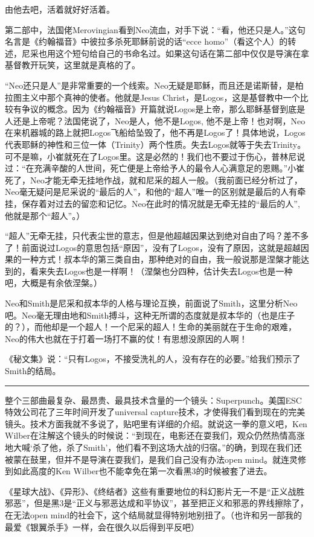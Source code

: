 \documentclass[UTF8]{ctexart}
\newcommand{\myparsep}{\noindent \rule[0.5ex]{\linewidth}{1pt}}
\begin{document}
由他去吧，活着就好好活着。

第二部中，法国佬Merovingian看到Neo流血，对手下说：“看，他还只是人。”这句名言是《约翰福音》中彼拉多杀死耶稣前说的话“ecce homo”（看这个人）的转述，尼采也用这个短句给自己的书命名过。如果这句话在第二部中仅仅是导演在拿基督教开玩笑，这里就是真格的了。

“Neo还只是人”是非常重要的一个线索。Neo无疑是耶稣，而且还是诺斯替，是柏拉图主义中那个真神的使者。他就是Jesus Christ，是Logos，这是基督教中一个比较有争议的概念。因为《约翰福音》开篇就说Logos是上帝，那么耶稣基督到底是人还是上帝呢？法国佬说了，Neo是人，他不是Logos, 他不是上帝！也对啊，Neo在来机器城的路上就把Logos飞船给坠毁了，他不再是Logos了！具体地说，Logos代表耶稣的神性和三位一体（Trinity）两个性质。失去Logos就等于失去Trinity。可不是嘛，小崔就死在了Logos里。这是必然的！我们也不要过于伤心，普林尼说过：“在充满辛酸的人世间，死亡便是上帝给予人的最令人心满意足的恩赐。”小崔死了，Neo才能无牵无挂地作战，就和尼采的超人一般。（我前面已经分析过了，Neo毫无疑问是尼采说的“最后的人”，和他的“超人”唯一的区别就是最后的人有牵挂，保存着对过去的留恋和记忆。Neo在此时的情况就是无牵无挂的“最后的人”, 他就是那个“超人”。）

“超人”无牵无挂，只代表尘世的意志，但是他超越因果达到绝对自由了吗？差不多了！前面说过Logos的意思包括“原因”，没有了Logos，没有了原因，这就是超越因果的一种方式！叔本华的第三类自由，那种绝对的自由，我一般说那是涅槃才能达到的，看来失去Logos也是一样啊！（涅槃也分四种，估计失去Logos也是一种吧，大概是有余依涅槃。）

Neo和Smith是尼采和叔本华的人格与理论互换，前面说了Smith，这里分析Neo吧。Neo毫无理由地和Smith搏斗，这种无所谓的态度就是叔本华的（也是庄子的？），而他却是一个超人！一个尼采的超人！生命的美丽就在于生命的艰难，Neo的伟大也就在于打着一场打不赢的仗！有思想没原因的人啊！

《秘文集》说：“只有Logos，不接受洗礼的人，没有存在的必要。”给我们预示了Smith的结局。

\myparsep

整个三部曲最复杂、最昂贵、最具技术含量的一个镜头：Superpunch。美国ESC特效公司花了三年时间开发了universal capture技术，才使得我们看到现在的完美镜头。技术方面我就不多说了，贴吧里有详细的介绍。就说这一拳的意义吧，Ken Wilber在注解这个镜头的时候说：“到现在，电影还在耍我们，观众仍然热情高涨地大喊‘杀了他，杀了Smith’，他们看不到这场大战的归宿。”的确，到现在我们还被蒙在鼓里，但并不是导演在耍我们，是我们自己没有办法open mind。就连灵修到如此高度的Ken Wilber也不能幸免在第一次看黑3的时候被套了进去。

《星球大战》、《异形》、《终结者》这些有重要地位的科幻影片无一不是“正义战胜邪恶”，但是黑3是“正义与邪恶达成和平协议”，甚至把正义和邪恶的界线擦除了，在无法open mind的社会下，这个结局就显得特别地别扭了。（也许和另一部我的最爱《银翼杀手》一样，会在很久以后得到平反吧）
\end{document}
